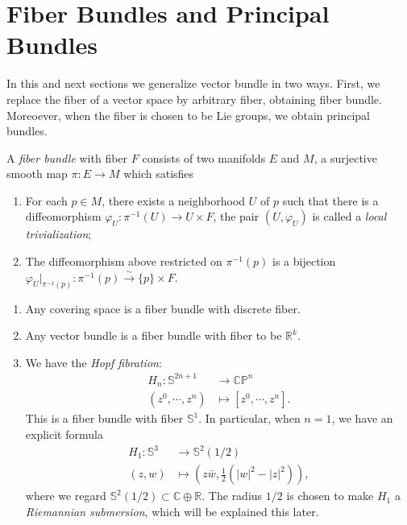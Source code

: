 \section{Fiber Bundles and Principal Bundles}

In this and next sections we generalize vector bundle in two ways.
First, we replace the fiber of a vector space by arbitrary fiber, obtaining fiber bundle.
Moreoever, when the fiber is chosen to be Lie groups, we obtain principal bundles.

\begin{defn}
    A \emph{fiber bundle} with fiber $F$ consists of two manifolds $E$ and $M$, a surjective smooth map $\pi:E\to M$ which satisfies
    \begin{enumerate}[(1)]
        \item For each $p\in M$, there exists a neighborhood $U$ of $p$ such that there is a diffeomorphism $\varphi_U:\pi^{-1}(U)\to U\times F$, the pair $(U,\varphi_U)$ is called a \emph{local trivialization};
        \item The diffeomorphism above restricted on $\pi^{-1}(p)$ is a bijection $\varphi_U|_{\pi^{-1}(p)}:\pi^{-1}(p)\xrightarrow{\sim}\{p\}\times F$.
    \end{enumerate}
\end{defn}

\begin{eg}
    \begin{enumerate}[(1)]
        \item Any covering space is a fiber bundle with discrete fiber.
        \item Any vector bundle is a fiber bundle with fiber to be $\mathbb{R}^k$.
        \item We have the \emph{Hopf fibration}:
        \begin{align*}
            H_n:\mathbb{S}^{2n+1}&\to\mathbb{CP}^n\\
            (z^0,\cdots,z^n)&\mapsto[z^0,\cdots,z^n].
        \end{align*}
        This is a fiber bundle with fiber $\mathbb{S}^1$.
        In particular, when $n=1$, we have an explicit formula
        \begin{align*}
            H_1:\mathbb{S}^3&\to\mathbb{S}^2(1/2)\\
            (z,w)&\mapsto\left(z\bar{w},\frac{1}{2}\left(|w|^2-|z|^2\right)\right),
        \end{align*}
        where we regard $\mathbb{S}^2(1/2)\subset\mathbb{C}\oplus\mathbb{R}$.
        The radius $1/2$ is chosen to make $H_1$ a \emph{Riemannian submersion}, which will be explained this later.
    \end{enumerate}
\end{eg}

